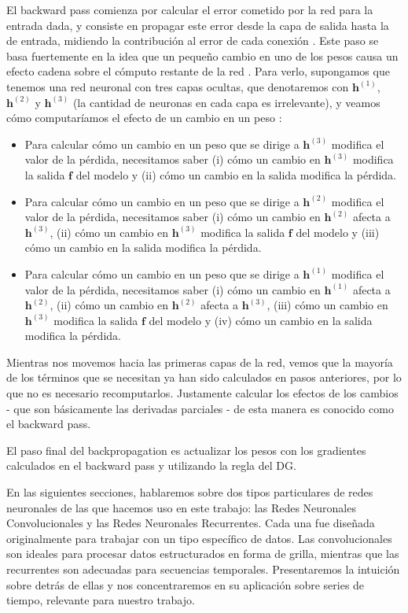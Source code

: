 \documentclass[../../main.tex]{subfiles}
\begin{document}
El backward pass comienza por calcular el error cometido por la red para la entrada dada,
y consiste en propagar este error desde la capa de salida hasta la de entrada, midiendo la
contribución al error de cada conexión \cite{hands-on-ML-sklearn-tf}. Este paso se basa
fuertemente en la idea que un pequeño cambio en uno de los pesos causa un efecto cadena
sobre el cómputo restante de la red \cite{prince2024understanding}. Para verlo, supongamos
que tenemos una red neuronal con tres capas ocultas, que denotaremos con \(\bm{h}^{(1)}\),
\(\bm{h}^{(2)}\) y \(\bm{h}^{(3)}\) (la cantidad de neuronas en cada capa es irrelevante),
y veamos cómo computaríamos el efecto de un cambio en un peso
\cite{prince2024understanding}:
\begin{itemize}
    \item Para calcular cómo un cambio en un peso que se dirige a \(\bm{h}^{(3)}\)
    modifica el valor de la pérdida, necesitamos saber (i) cómo un cambio en \(\bm{h}^{(3)}\)
    modifica la salida \(\bm{f}\) del modelo y (ii) cómo un cambio en la salida
    modifica la pérdida.
    \item Para calcular cómo un cambio en un peso que se dirige a \(\bm{h}^{(2)}\)
    modifica el valor de la pérdida, necesitamos saber (i) cómo un cambio en
    \(\bm{h}^{(2)}\) afecta a \(\bm{h}^{(3)}\), (ii) cómo un cambio en \(\bm{h}^{(3)}\)
    modifica la salida \(\bm{f}\) del modelo y (iii) cómo un cambio en la salida
    modifica la pérdida.
    \item Para calcular cómo un cambio en un peso que se dirige a \(\bm{h}^{(1)}\)
    modifica el valor de la pérdida, necesitamos saber (i) cómo un cambio en
    \(\bm{h}^{(1)}\) afecta a \(\bm{h}^{(2)}\), (ii) cómo un cambio en
    \(\bm{h}^{(2)}\) afecta a \(\bm{h}^{(3)}\), (iii) cómo un cambio en \(\bm{h}^{(3)}\)
    modifica la salida \(\bm{f}\) del modelo y (iv) cómo un cambio en la salida
    modifica la pérdida.
\end{itemize}
Mientras nos movemos hacia las primeras capas de la red, vemos que la mayoría de los
términos que se necesitan ya han sido calculados en pasos anteriores, por lo que no es
necesario recomputarlos. Justamente calcular los efectos de los cambios - que son
básicamente las derivadas parciales - de esta manera es conocido como el backward pass.

El paso final del backpropagation es actualizar los pesos con los gradientes calculados
en el backward pass y utilizando la regla del DG.

\bigskip
En las siguientes secciones, hablaremos sobre dos tipos particulares de redes neuronales
de las que hacemos uso en este trabajo: las Redes Neuronales Convolucionales y las Redes
Neuronales Recurrentes. Cada una fue diseñada originalmente para trabajar con un tipo
específico de datos. Las convolucionales son ideales para procesar datos estructurados en
forma de grilla, mientras que las recurrentes son adecuadas para secuencias temporales.
Presentaremos la intuición sobre detrás de ellas y nos concentraremos en su aplicación
sobre series de tiempo, relevante para nuestro trabajo.
\end{document}
